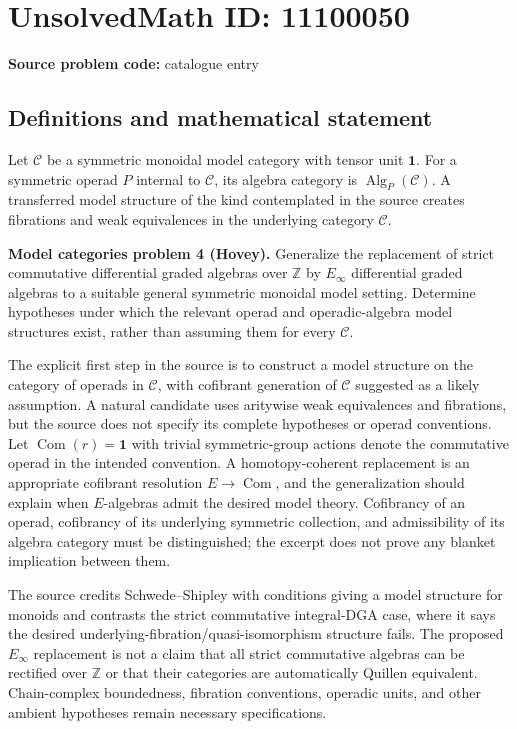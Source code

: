 \documentclass[11pt]{article}
\newcommand{\Z}{\mathbb{Z}}
\begin{document}
\section*{UnsolvedMath ID: 11100050}
\textbf{Source problem code:} catalogue entry
\subsection{Definitions and mathematical statement}
Let $\mathcal C$ be a symmetric monoidal model category with tensor unit $\mathbf1$. For a symmetric operad $P$ internal to $\mathcal C$, its algebra category is $\operatorname{Alg}_P(\mathcal C)$. A transferred model structure of the kind contemplated in the source creates fibrations and weak equivalences in the underlying category $\mathcal C$.

\textbf{Model categories problem 4 (Hovey).} Generalize the replacement of strict commutative differential graded algebras over $\Z$ by $E_\infty$ differential graded algebras to a suitable general symmetric monoidal model setting. Determine hypotheses under which the relevant operad and operadic-algebra model structures exist, rather than assuming them for every $\mathcal C$.

The explicit first step in the source is to construct a model structure on the category of operads in $\mathcal C$, with cofibrant generation of $\mathcal C$ suggested as a likely assumption. A natural candidate uses aritywise weak equivalences and fibrations, but the source does not specify its complete hypotheses or operad conventions. Let $\operatorname{Com}(r)=\mathbf1$ with trivial symmetric-group actions denote the commutative operad in the intended convention. A homotopy-coherent replacement is an appropriate cofibrant resolution $E\to\operatorname{Com}$, and the generalization should explain when $E$-algebras admit the desired model theory. Cofibrancy of an operad, cofibrancy of its underlying symmetric collection, and admissibility of its algebra category must be distinguished; the excerpt does not prove any blanket implication between them.

The source credits Schwede--Shipley with conditions giving a model structure for monoids and contrasts the strict commutative integral-DGA case, where it says the desired underlying-fibration/quasi-isomorphism structure fails. The proposed $E_\infty$ replacement is not a claim that all strict commutative algebras can be rectified over $\Z$ or that their categories are automatically Quillen equivalent. Chain-complex boundedness, fibration conventions, operadic units, and other ambient hypotheses remain necessary specifications.
\end{document}

